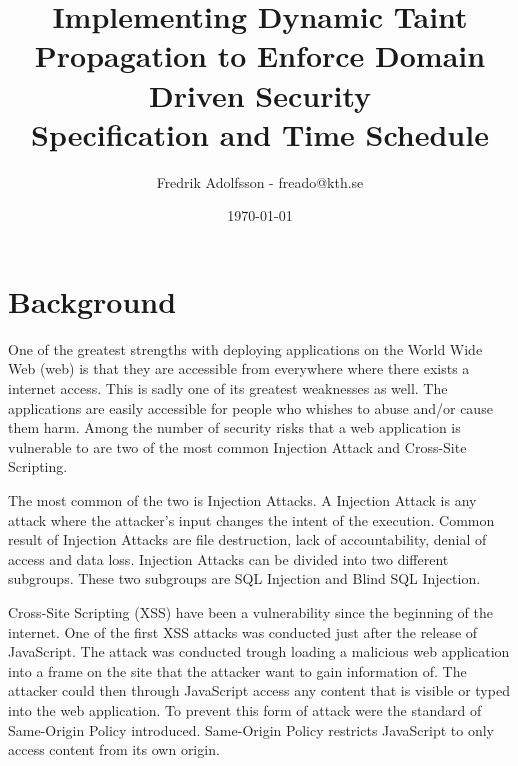 \documentclass{../kththesis}
\title{Implementing Dynamic Taint Propagation to Enforce Domain Driven Security \\
        \large Specification and Time Schedule}
\author{Fredrik Adolfsson - freado@kth.se}
\date{\today}
\begin{document}
\frontmatter


\titlepage


\tableofcontents


\mainmatter



\chapter{Background}
One of the greatest strengths with deploying applications on the World Wide Web (web) is that they are accessible from everywhere where there exists a internet access. This is sadly one of its greatest weaknesses as well. The applications are easily accessible for people who whishes to abuse and/or cause them harm. Among the number of security risks that a web application is vulnerable to are two of the most common Injection Attack and Cross-Site Scripting. \parencite{OpenWebApplicationSecurityProject, CrossMichael2007Dgtw}

The most common of the two is Injection Attacks. \parencite{OWASP2017} A Injection Attack is any attack where the attacker's input changes the intent of the execution. Common result of Injection Attacks are file destruction, lack of accountability, denial of access and data loss. \parencite{Secure_Web} Injection Attacks can be divided into two different subgroups. These two subgroups are SQL Injection and Blind SQL Injection. \parencite{Secure_Web}

Cross-Site Scripting (XSS) have been a vulnerability since the beginning of the internet. One of the first XSS attacks was conducted just after the release of JavaScript. The attack was conducted trough loading a malicious web application into a frame on the site that the attacker want to gain information of. The attacker could then through JavaScript access any content that is visible or typed into the web application. To prevent this form of attack were the standard of Same-Origin Policy introduced. Same-Origin Policy restricts JavaScript to only access content from its own origin. \parencite{FogieSeth2007Xacs, w3csop} 
\end{document}
